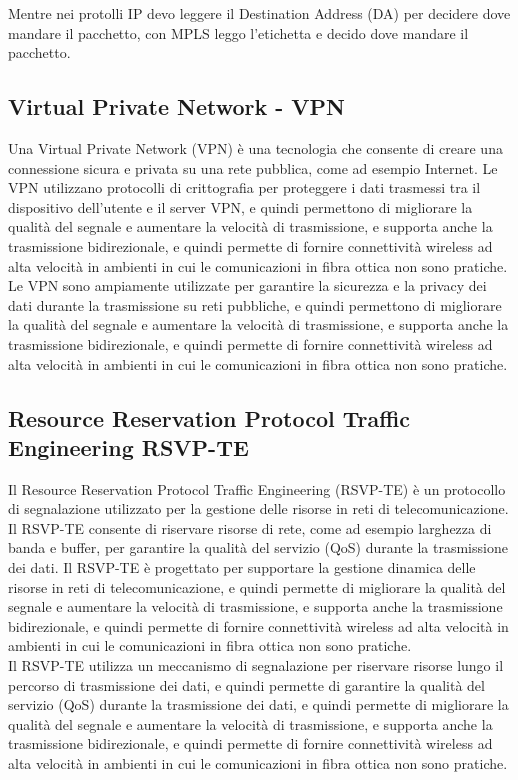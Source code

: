Mentre nei protolli IP devo leggere il Destination Address (DA) per decidere dove mandare il pacchetto, con MPLS leggo l'etichetta e decido dove mandare il pacchetto. 

\subsection{Virtual Private Network - VPN}
Una Virtual Private Network (VPN) è una tecnologia che consente di creare una connessione sicura e privata su una rete pubblica, come ad esempio Internet. Le VPN utilizzano protocolli di crittografia per proteggere i dati trasmessi tra il dispositivo dell'utente e il server VPN, e quindi permettono di migliorare la qualità del segnale e aumentare la velocità di trasmissione, e supporta anche la trasmissione bidirezionale, e quindi permette di fornire connettività wireless ad alta velocità in ambienti in cui le comunicazioni in fibra ottica non sono pratiche.\\
Le VPN sono ampiamente utilizzate per garantire la sicurezza e la privacy dei dati durante la trasmissione su reti pubbliche, e quindi permettono di migliorare la qualità del segnale e aumentare la velocità di trasmissione, e supporta anche la trasmissione bidirezionale, e quindi permette di fornire connettività wireless ad alta velocità in ambienti in cui le comunicazioni in fibra ottica non sono pratiche.\\

\subsection{Resource Reservation Protocol Traffic Engineering RSVP-TE}
Il Resource Reservation Protocol Traffic Engineering (RSVP-TE) è un protocollo di segnalazione utilizzato per la gestione delle risorse in reti di telecomunicazione. Il RSVP-TE consente di riservare risorse di rete, come ad esempio larghezza di banda e buffer, per garantire la qualità del servizio (QoS) durante la trasmissione dei dati. Il RSVP-TE è progettato per supportare la gestione dinamica delle risorse in reti di telecomunicazione, e quindi permette di migliorare la qualità del segnale e aumentare la velocità di trasmissione, e supporta anche la trasmissione bidirezionale, e quindi permette di fornire connettività wireless ad alta velocità in ambienti in cui le comunicazioni in fibra ottica non sono pratiche.\\

Il RSVP-TE utilizza un meccanismo di segnalazione per riservare risorse lungo il percorso di trasmissione dei dati, e quindi permette di garantire la qualità del servizio (QoS) durante la trasmissione dei dati, e quindi permette di migliorare la qualità del segnale e aumentare la velocità di trasmissione, e supporta anche la trasmissione bidirezionale, e quindi permette di fornire connettività wireless ad alta velocità in ambienti in cui le comunicazioni in fibra ottica non sono pratiche.\\

